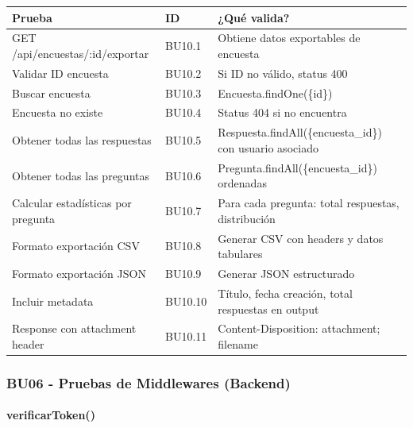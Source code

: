 \begin{table}[H]
\centering
\begin{tabular}{|l|l|p{6cm}|}
\hline
\textbf{Prueba} & \textbf{ID} & \textbf{¿Qué valida?} \\ \hline
GET /api/encuestas/:id/exportar & BU10.1 & Obtiene datos exportables de encuesta \\ \hline
Validar ID encuesta & BU10.2 & Si ID no válido, status 400 \\ \hline
Buscar encuesta & BU10.3 & Encuesta.findOne(\{id\}) \\ \hline
Encuesta no existe & BU10.4 & Status 404 si no encuentra \\ \hline
Obtener todas las respuestas & BU10.5 & Respuesta.findAll(\{encuesta\_id\}) con usuario asociado \\ \hline
Obtener todas las preguntas & BU10.6 & Pregunta.findAll(\{encuesta\_id\}) ordenadas \\ \hline
Calcular estadísticas por pregunta & BU10.7 & Para cada pregunta: total respuestas, distribución \\ \hline
Formato exportación CSV & BU10.8 & Generar CSV con headers y datos tabulares \\ \hline
Formato exportación JSON & BU10.9 & Generar JSON estructurado \\ \hline
Incluir metadata & BU10.10 & Título, fecha creación, total respuestas en output \\ \hline
Response con attachment header & BU10.11 & Content-Disposition: attachment; filename \\ \hline
\end{tabular}
\end{table}

\subsubsection{BU06 - Pruebas de Middlewares (Backend)}

\paragraph{verificarToken()}

